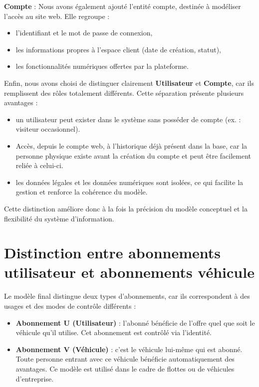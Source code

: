 \documentclass[a4paper,12pt]{report}
\begin{document}
\noindent \textbf{Compte} : Nous avons également ajouté l’entité compte, destinée à modéliser l’accès 
au site web. Elle regroupe :
\begin{itemize}
    \item l’identifiant et le mot de passe de connexion,
    \item les informations propres à l’espace client (date de création, statut),
    \item les fonctionnalités numériques offertes par la plateforme.
\end{itemize}

\vspace{5mm}

Enfin, nous avons choisi de distinguer clairement \textbf{Utilisateur} et \textbf{Compte}, 
car ils remplissent des rôles totalement différents. Cette séparation présente plusieurs avantages :
\begin{itemize}
    \item un utilisateur peut exister dans le système sans posséder de compte (ex. : visiteur occasionnel).
    \item Accès, depuis le compte web, à l’historique déjà présent dans la base, car la personne physique existe avant la création du compte et peut être facilement reliée à celui-ci.
    \item les données légales et les données numériques sont isolées, ce qui facilite la gestion et renforce la cohérence du modèle.
\end{itemize}

Cette distinction améliore donc à la fois la précision du modèle conceptuel et la flexibilité du système d’information.

\section{Distinction entre abonnements utilisateur et abonnements véhicule}
\label{subsec:abonnements}

Le modèle final distingue deux types d’abonnements, car ils correspondent à des usages 
et des modes de contrôle différents :

\begin{itemize}
    \item \textbf{Abonnement U (Utilisateur)} : l’abonné bénéficie de l’offre quel que 
    soit le véhicule qu’il utilise. Cet abonnement est contrôlé via l’identité.

    \item \textbf{Abonnement V (Véhicule)} : c’est le véhicule lui-même qui est abonné. 
    Toute personne entrant avec ce véhicule bénéficie automatiquement des avantages. 
    Ce modèle est utilisé dans le cadre de flottes ou de véhicules d’entreprise.
\end{itemize}
\end{document}
